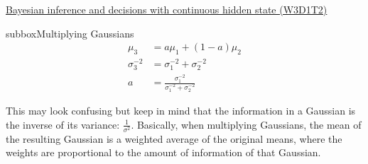\begin{textbox}{\href{https://compneuro.neuromatch.io/tutorials/W3D1_BayesianDecisions/student/W3D1_Tutorial2.html}{Bayesian inference and decisions with continuous hidden state (W3D1T2)} }
\begin{subbox}{subbox}{Multiplying Gaussians}
\begin{align}
\mu_{3} &= a\mu_{1} + (1-a)\mu_{2} \\
\sigma_{3}^{-2} &= \sigma_{1}^{-2} + \sigma_{2}^{-2} \\
a &= \frac{\sigma_{1}^{-2}}{\sigma_{1}^{-2} + \sigma_{2}^{-2}}
\end{align}

This may look confusing but keep in mind that the information in a Gaussian is the inverse of its variance: $\frac{1}{\sigma^2}$. Basically, when multiplying Gaussians, the mean of the resulting Gaussian is a weighted average of the original means, where the weights are proportional to the amount of information of that Gaussian.

\end{subbox}
\end{textbox}

